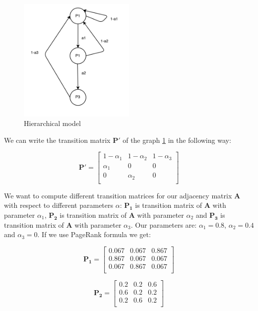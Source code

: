 \documentclass{article}
\begin{document}
\begin{figure}
\centering
\includegraphics[width=0.5\textwidth]{adjacency3a}
\caption{Hierarchical model}
\label{fig:adjacency3a}
\end{figure}

We can write the transition matrix $\mathbf{P'}$ of the graph \ref{fig:adjacency3a} in the following way:

\[\mathbf{P'}=
\begin{bmatrix}
    1-\alpha_1 & 1-\alpha_2 & 1-\alpha_3  \\
    \alpha_1 & 0 & 0 \\
    0 & \alpha_2 & 0  \\
\end{bmatrix}
\]

We want to compute different transition matrices for our adjacency matrix $\mathbf{A}$ with respect to different parameters $\alpha$: $\mathbf{P_1}$ is transition matrix of $\mathbf{A}$ with parameter $\alpha_1$, $\mathbf{P_2}$ is transition matrix of $\mathbf{A}$ with parameter $\alpha_2$ and $\mathbf{P_3}$ is transition matrix of $\mathbf{A}$ with parameter $\alpha_3$. Our parameters are: $\alpha_1 = 0.8$, $\alpha_2 = 0.4$ and $\alpha_3 = 0$. If we use PageRank formula we get:

\[\mathbf{P_1}=
\begin{bmatrix}
    0.067 &  0.067 &  0.867 \\
    0.867 & 0.067 &  0.067  \\
    0.067 & 0.867 & 0.067 \\
\end{bmatrix}
\]

\[\mathbf{P_2}=
\begin{bmatrix}
    0.2 &  0.2 &  0.6 \\
    0.6 & 0.2 &  0.2  \\
    0.2 & 0.6 & 0.2 \\
\end{bmatrix}
\]
\end{document}
